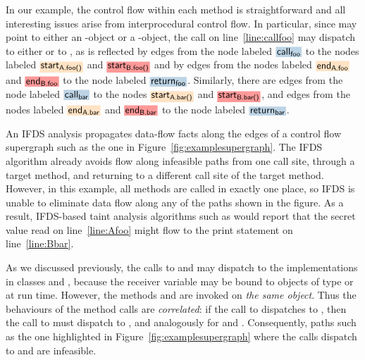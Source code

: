 In our example, the control flow within each method is straightforward and
all interesting issues arise from interprocedural control flow. In particular,
since   may point to either an -object or a -object, 
the call on line~\ref{line:callfoo} may dispatch to either  or to ,
as is reflected by edges  
  from the node labeled $\highlight{\code{call}_\code{foo}}{greyblue}$ to the nodes labeled
  $\highlight{\code{start}_\code{A.foo()}}{bisque}$ and $\highlight{\code{start}_\code{B.foo()}}{lightsalmonpink}$
and by edges
  from the nodes labeled $\highlight{\code{end}_\code{A.foo}}{bisque}$ and $\highlight{\code{end}_\code{B.foo}}{lightsalmonpink}$ 
  to the node labeled  $\highlight{\code{return}_\code{foo}}{greyblue}$.  
Similarly, there are edges from the node labeled $\highlight{\code{call}_\code{bar}}{greyblue}$ to the nodes 
$\highlight{\code{start}_\code{A.bar()}}{bisque}$ and $\highlight{\code{start}_\code{B.bar()}}{lightsalmonpink}$, and 
edges
  from the nodes labeled $\highlight{\code{end}_\code{A.bar}}{bisque}$ and $\highlight{\code{end}_\code{B.bar}}{lightsalmonpink}$ 
  to the node labeled  $\highlight{\code{return}_\code{bar}}{greyblue}$. 
 
An IFDS analysis propagates data-flow facts along the edges
of a control flow supergraph such as the one in Figure~\ref{fig:examplesupergraph}. The
IFDS algorithm already avoids flow along infeasible paths from one call site, through a target method,
and returning to a different call site of the target method.
However, in this example, all methods are
called in exactly one place, so IFDS is unable to eliminate data flow along any of the
paths shown in the figure. As a result, IFDS-based taint analysis algorithms such as
\cite{DBLP:conf/issta/GuarnieriPTDTB11,DBLP:conf/pldi/ArztRFBBKTOM14} would report 
that the secret value read on line~\ref{line:Afoo}
might flow to the print statement on line~\ref{line:Bbar}. 

As we discussed previously, the calls to  and  may dispatch
to the implementations in classes  and , 
because the receiver variable  may be bound to
 objects of type  or  at run time. 
However, the methods  and  are invoked
on \textit{the same object}. Thus the behaviours of the method calls
are \textit{correlated}: if the call to  dispatches to ,
then the call to  must dispatch to , and analogously
for  and .
Consequently, paths such as the one highlighted in
Figure~\ref{fig:examplesupergraph} where the calls dispatch to
 and 
are infeasible.  

